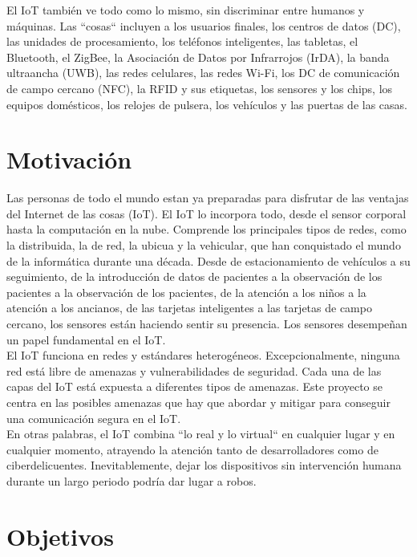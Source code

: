 El IoT también ve todo como lo mismo, sin discriminar entre humanos y máquinas. Las ``cosas`` incluyen a los usuarios finales, los centros de datos (DC), las unidades de procesamiento, los teléfonos inteligentes, las tabletas, el Bluetooth, el ZigBee, la Asociación de Datos por Infrarrojos (IrDA), la banda ultraancha (UWB), las redes celulares, las redes Wi-Fi, los DC de comunicación de campo cercano (NFC), la RFID y sus etiquetas, los sensores y los chips, los equipos domésticos, los relojes de pulsera, los vehículos y las puertas de las casas.\\

\section{Motivación}

Las personas de todo el mundo estan ya preparadas para disfrutar de las ventajas del Internet de las cosas (IoT). El IoT lo incorpora todo, desde el sensor corporal hasta la computación en la nube. Comprende los principales tipos de redes, como la distribuida, la de red, la ubicua y la vehicular, que han conquistado el mundo de la informática durante una década. Desde de estacionamiento de vehículos a su seguimiento, de la introducción de datos de pacientes a la observación de los pacientes a la observación de los pacientes, de la atención a los niños a la atención a los ancianos, de las tarjetas inteligentes a las tarjetas de campo cercano, los sensores están haciendo sentir su presencia. Los sensores desempeñan un papel fundamental en el IoT.\\

El IoT funciona en redes y estándares heterogéneos. Excepcionalmente, ninguna red está libre de amenazas y vulnerabilidades de seguridad. Cada una de las capas del IoT está expuesta a diferentes tipos de amenazas. Este proyecto se centra en las posibles amenazas que hay que abordar y mitigar para conseguir una comunicación segura en el IoT.\\

En otras palabras, el IoT combina ``lo real y lo virtual`` en cualquier lugar y en cualquier momento, atrayendo la atención tanto de desarrolladores como de ciberdelicuentes. Inevitablemente, dejar los dispositivos sin intervención humana durante un largo periodo podría dar lugar a robos.

\section{Objetivos}

